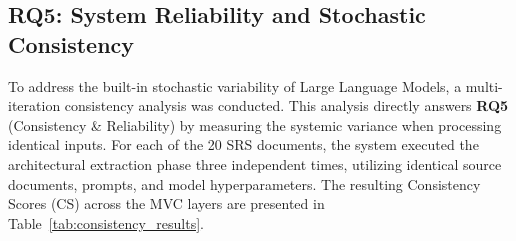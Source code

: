 \subsection{RQ5: System Reliability and Stochastic Consistency}

To address the built-in stochastic variability of Large Language Models, a multi-iteration consistency analysis was conducted. This analysis directly answers \textbf{RQ5} (Consistency \& Reliability) by measuring the systemic variance when processing identical inputs. For each of the 20 SRS documents, the system executed the architectural extraction phase three independent times, utilizing identical source documents, prompts, and model hyperparameters. The resulting Consistency Scores (CS) across the MVC layers are presented in Table~\ref{tab:consistency_results}.

